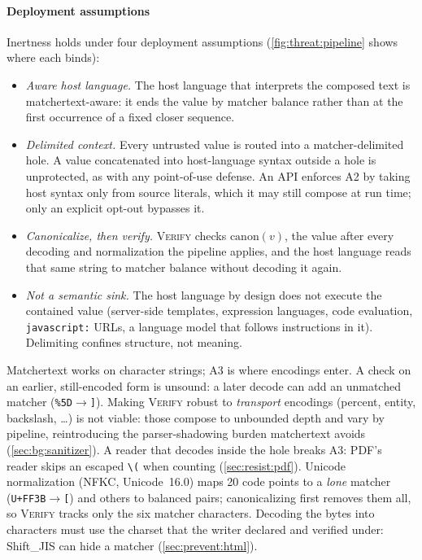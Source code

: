 \paragraph{Deployment assumptions}
Inertness holds under four deployment assumptions
(\cref{fig:threat:pipeline} shows where each binds):
\begin{itemize}
\item[\textbf{A1}] \emph{Aware host language.} The host language that interprets the composed text
	is matchertext-aware: it ends the value by matcher balance rather
	than at the first occurrence of a fixed closer sequence.
\item[\textbf{A2}] \emph{Delimited context.} Every untrusted value is routed
	into a matcher-delimited hole. A value concatenated into host-language syntax
	outside a hole is unprotected, as with any point-of-use defense.
	An API enforces A2 by taking host syntax only from source literals, which it
	may still compose at run time; only an explicit opt-out bypasses it.
\item[\textbf{A3}] \emph{Canonicalize, then verify.} \textsc{Verify} checks
	$\mathrm{canon}(v)$, the value after every decoding and normalization the
	pipeline applies, and the host language reads that same string to matcher
	balance without decoding it again.
\item[\textbf{A4}] \emph{Not a semantic sink.}
	The host language by design does not execute the
	contained value (server-side templates, expression languages,
	code evaluation, \verb|javascript:| URLs, a language model that follows
	instructions in it). Delimiting confines structure, not meaning.
\end{itemize}
Matchertext works on character strings; A3 is where encodings enter.
A check on an earlier, still-encoded form is unsound: a later decode can add
an unmatched matcher (\eg \verb|%5D|$\rightarrow$\verb|]|).
Making \textsc{Verify} robust to \emph{transport} encodings
(percent, entity, backslash, \dots) is not viable: those compose to
unbounded depth and vary by pipeline, reintroducing the parser-shadowing
burden matchertext avoids (\cref{sec:bg:sanitizer}).
A reader that decodes inside the hole breaks A3: PDF's reader skips an escaped
\verb|\(| when counting (\cref{sec:resist:pdf}).
Unicode normalization (NFKC, Unicode~16.0) maps 20 code points to a \emph{lone}
matcher (\eg \texttt{U+FF3B}$\rightarrow$\texttt{[}) and others to balanced
pairs; canonicalizing first removes them all, so \textsc{Verify} tracks only the
six matcher characters.
Decoding the bytes into characters must use the charset that the writer declared
and verified under: Shift\_JIS can hide a matcher (\cref{sec:prevent:html}).


